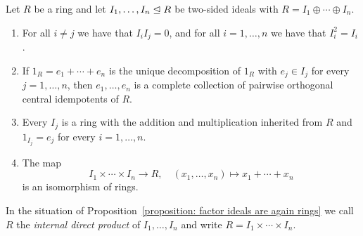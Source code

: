 \begin{proposition}
  \label{proposition: factor ideals are again rings}
  Let $R$ be a ring and let $I_1, \dotsc, I_n \trianglelefteq R$ be two-sided ideals with $R = I_1 \oplus \dotsb \oplus I_n$.
  \begin{enumerate}
    \item
      For all $i \neq j$ we have that $I_i I_j = 0$, and for all $i = 1, \dotsc, n$ we have that $I_i^2 = I_i$.
    \item
      If $1_R = e_1 + \dotsb + e_n$ is the unique decomposition of $1_R$ with $e_j \in I_j$ for every $j = 1, \dotsc, n$, then $e_1, \dotsc, e_n$ is a complete collection of pairwise orthogonal central idempotents of $R$. 
    \item
      Every $I_j$ is a ring with the addition and multiplication inherited from $R$ and $1_{I_j} = e_j$ for every $i = 1, \dotsc, n$.
    \item
      The map
      \[
            I_1 \times \dotsb \times I_n
        \to R,
        \quad   (x_1, \dotsc, x_n)
        \mapsto x_1 + \dotsb + x_n
      \]
      is an isomorphism of rings.
  \end{enumerate}
\end{proposition}


\begin{definition}
  \label{definition: internal direct product of rings}
  In the situation of Proposition~\ref{proposition: factor ideals are again rings} we call $R$ the \emph{internal direct product} of $I_1, \dotsc, I_n$ and write $R = I_1 \times \dotsb \times I_n$.
\end{definition}


